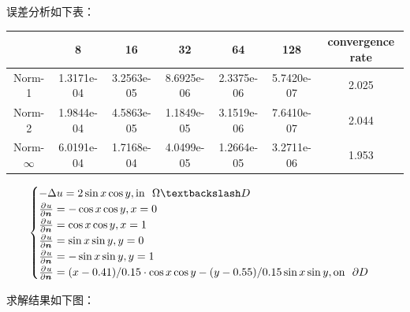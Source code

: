 \documentclass[lang=cn,a4paper,newtx,bibend=bibtex]{elegantpaper}
\begin{document}
误差分析如下表：

\begin{table}[H]
  \centering
  \begin{tabular}{|c|c|c|c|c|c|c|}
  \hline
   & 8 & 16 & 32 & 64 & 128 & convergence rate \\
  \hline
  Norm-1 & 1.3171e-04 & 3.2563e-05 & 8.6925e-06 & 2.3375e-06 & 5.7420e-07 & 2.025 \\
  Norm-2 & 1.9844e-04 & 4.5863e-05 & 1.1849e-05 & 3.1519e-06 & 7.6410e-07 & 2.044 \\
  Norm-$\infty$ & 6.0191e-04 & 1.7168e-04 & 4.0499e-05 & 1.2664e-05 & 3.2711e-06 & 1.953 \\
  \hline
  \end{tabular}
  \end{table}


\[
\begin{cases}
  - \Delta u = 2\sin x \cos y, \text{in~~} \Omega \fxg D \\
  \apart{u}{\bm{n}}{} = - \cos x \cos y, x = 0 \\
  \apart{u}{\bm{n}}{} = \cos x \cos y, x = 1 \\  
  \apart{u}{\bm{n}}{} = \sin x \sin y, y = 0 \\
  \apart{u}{\bm{n}}{} = - \sin x \sin y, y = 1 \\  
  \apart{u}{\bm{n}}{} = (x - 0.41)/0.15\cdot \cos x \cos y - ( y - 0.55) / 0.15 \sin x \sin y, \text{on~~} \partial D
\end{cases}
\]

求解结果如下图：
\end{document}

